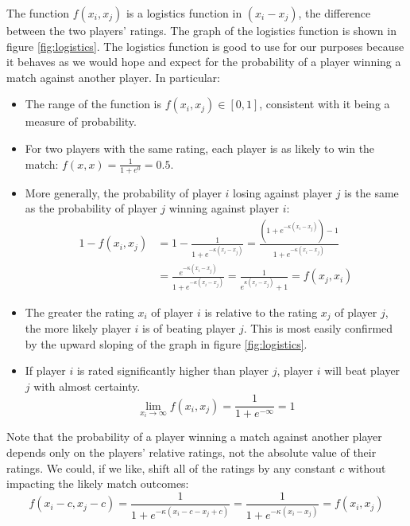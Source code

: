 \documentclass{article}
\begin{document}
The function $f(x_i, x_j)$ is a logistics function in $(x_i - x_j)$, the
difference between the two players' ratings. The graph of the logistics
function is shown in figure \ref{fig:logistics}. The logistics function is
good to use for our purposes because it behaves as we would hope and expect
for the probability of a player winning a match against another player. In
particular:
\begin{itemize}
  \item The range of the function is $f(x_i, x_j) \in [0, 1]$, consistent with
    it being a measure of probability.

  \item For two players with the same rating, each player is as likely to win
    the match: $f(x, x) = \frac{1}{1 + e^0} = 0.5$.

  \item More generally, the probability of player $i$ losing against player
    $j$ is the same as the probability of player $j$ winning against player
    $i$:
    \begin{align*}
      1 - f(x_i, x_j) &= 1 - \frac{1}{1 + e^{-\kappa(x_i - x_j)}} = \frac{(1 + e^{-\kappa(x_i - x_j)}) - 1}{1 + e^{-\kappa(x_i - x_j)}} \\
                      &= \frac{e^{-\kappa(x_i - x_j)}}{1 + e^{-\kappa(x_i - x_j)}} = \frac{1}{e^{\kappa(x_i - x_j)} + 1} = f(x_j, x_i)
    \end{align*}

  \item The greater the rating $x_i$ of player $i$ is relative to the rating
    $x_j$ of player $j$, the more likely player $i$ is of beating player $j$.
    This is most easily confirmed by the upward sloping of the graph in figure
    \ref{fig:logistics}.

  \item If player $i$ is rated significantly higher than player $j$, player
    $i$ will beat player $j$ with almost certainty.
    \begin{equation*}
      \lim_{x_i \to \infty} f(x_i, x_j) = \frac{1}{1 + e^{-\infty}} = 1
    \end{equation*}
\end{itemize}

Note that the probability of a player winning a match against another player
depends only on the players' relative ratings, not the absolute value of their
ratings. We could, if we like, shift all of the ratings by any constant $c$
without impacting the likely match outcomes:
\begin{equation*}
  f(x_i - c, x_j - c) =
  \frac{1}{1 + e^{-\kappa(x_i - c - x_j + c)}} =
  \frac{1}{1 + e^{-\kappa(x_i - x_j)}} = f(x_i, x_j)
\end{equation*}
\end{document}
